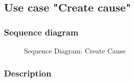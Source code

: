 \subsection{Use case "Create cause"}

\subsubsection{Sequence diagram}

\begin{figure}[H]
\centering
{}
\caption{Sequence Diagram: Create Cause}
\label{fig:chapter2-create-cause}
\end{figure}

\subsubsection{Description}

